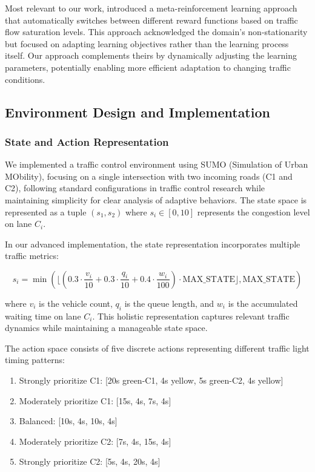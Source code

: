 Most relevant to our work, \citet{meta-rl-traffic} introduced a meta-reinforcement learning approach that automatically switches between different reward functions based on traffic flow saturation levels. This approach acknowledged the domain's non-stationarity but focused on adapting learning objectives rather than the learning process itself. Our approach complements theirs by dynamically adjusting the learning parameters, potentially enabling more efficient adaptation to changing traffic conditions.

\subsection{Environment Design and Implementation}

\subsubsection{State and Action Representation}

We implemented a traffic control environment using SUMO (Simulation of Urban MObility), focusing on a single intersection with two incoming roads (C1 and C2), following standard configurations in traffic control research while maintaining simplicity for clear analysis of adaptive behaviors. The state space is represented as a tuple $(s_1, s_2)$ where $s_i \in [0, 10]$ represents the congestion level on lane $C_i$.

In our advanced implementation, the state representation incorporates multiple traffic metrics:

\begin{equation}
s_i = \min(\lfloor (0.3 \cdot \frac{v_i}{10} + 0.3 \cdot \frac{q_i}{10} + 0.4 \cdot \frac{w_i}{100}) \cdot \text{MAX\_STATE} \rfloor, \text{MAX\_STATE})
\end{equation}

where $v_i$ is the vehicle count, $q_i$ is the queue length, and $w_i$ is the accumulated waiting time on lane $C_i$. This holistic representation captures relevant traffic dynamics while maintaining a manageable state space.

The action space consists of five discrete actions representing different traffic light timing patterns:

\begin{enumerate}
    \item Strongly prioritize C1: [20s green-C1, 4s yellow, 5s green-C2, 4s yellow]
    \item Moderately prioritize C1: [15s, 4s, 7s, 4s]
    \item Balanced: [10s, 4s, 10s, 4s]
    \item Moderately prioritize C2: [7s, 4s, 15s, 4s]
    \item Strongly prioritize C2: [5s, 4s, 20s, 4s]
\end{enumerate}


